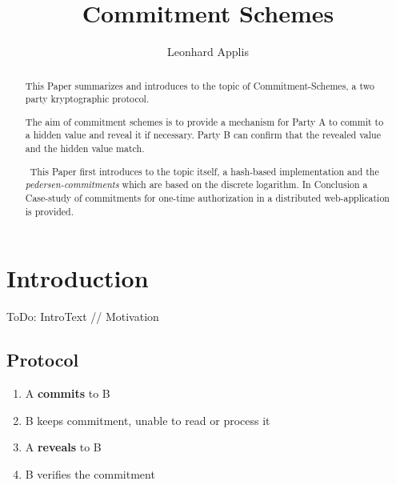 \documentclass[conference]{IEEEtran}
\begin{document}
\title{Commitment Schemes}

\author{Leonhard Applis}

\maketitle

\begin{abstract}
This Paper summarizes and  introduces to  the topic of Commitment-Schemes, a two party kryptographic protocol. 

The aim of commitment schemes is to provide a mechanism for Party A to commit to a hidden value and reveal it if necessary. Party B can confirm that the revealed value and the hidden value match.

~\newline This Paper first introduces to the topic itself, a hash-based implementation and the \textit{pedersen-commitments} which are based on the discrete logarithm. In Conclusion a Case-study of commitments for one-time authorization in a distributed web-application is provided. 
\end{abstract}


\section{Introduction}
ToDo: IntroText // Motivation
\subsection{Protocol}

\begin{enumerate}
	\item A \textbf{commits} to B
	\item B keeps commitment, unable to read or process it
	\item A \textbf{reveals} to B
	\item B verifies the commitment 
\end{enumerate}
\end{document}
